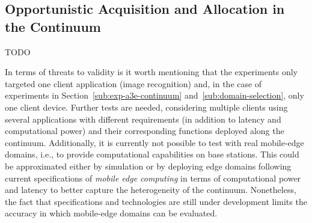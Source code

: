 


\subsection{Opportunistic Acquisition and Allocation in the Continuum}
TODO

In terms of threats to validity is it worth mentioning that the experiments only targeted one client application (image recognition) and, in the case of experiments in Section~\ref{sub:exp-a3e-continuum} and~\ref{sub:domain-selection}, only one client device. Further tests are needed, considering multiple clients using several applications with different requirements (in addition to latency and computational power) and their corresponding functions deployed along the continuum. Additionally, it is currently not possible to test with real mobile-edge domains, i.e., to provide computational capabilities on base stations. This could be approximated either by simulation or by deploying edge domains following current specifications of \textit{mobile edge computing} in terms of computational power and latency to better capture the heterogeneity of the continuum. Nonetheless, the fact that specifications and technologies are still under development limits the accuracy in which mobile-edge domains can be evaluated.  %



